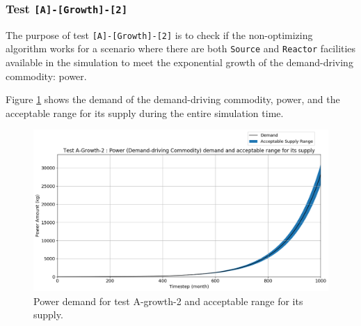 \documentclass[11pt,letterpaper]{article}
\begin{document}
\subsubsection{Test \texttt{[A]-[Growth]-[2]}}
The purpose of test \texttt{[A]-[Growth]-[2]} is to check if the non-optimizing algorithm works for a scenario where there are both \texttt{Source} and \texttt{Reactor} facilities available in the simulation to meet the exponential growth of the demand-driving commodity: power. 

Figure \ref{fig:test-a-growth-2-demand} shows the demand of the demand-driving commodity, power, and the acceptable range for its supply during the entire simulation time.  

\begin{figure}[H]
	\begin{center}
		\includegraphics[scale=0.4]{./figures/Power_A-Growth-2_demand_supply.png}
	\end{center}
        \caption{Power demand for test A-growth-2 and acceptable range for its supply.}
	\label{fig:test-a-growth-2-demand}
\end{figure}
\end{document}
